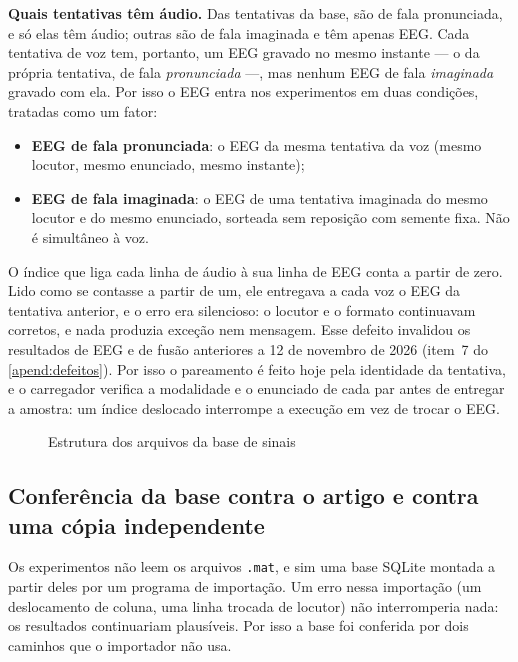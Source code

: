 		\par \textbf{Quais tentativas têm áudio.} Das tentativas da base,  são de fala pronunciada, e só elas têm áudio; outras  são de fala imaginada e têm apenas \ac{EEG}. Cada tentativa de voz tem, portanto, um \ac{EEG} gravado no mesmo instante --- o da própria tentativa, de fala \emph{pronunciada} ---, mas nenhum \ac{EEG} de fala \emph{imaginada} gravado com ela. Por isso o \ac{EEG} entra nos experimentos em duas condições, tratadas como um fator:
		\begin{itemize}
			\item \textbf{\ac{EEG} de fala pronunciada}: o \ac{EEG} da mesma tentativa da voz (mesmo locutor, mesmo enunciado, mesmo instante);
			\item \textbf{\ac{EEG} de fala imaginada}: o \ac{EEG} de uma tentativa imaginada do mesmo locutor e do mesmo enunciado, sorteada sem reposição com semente fixa. Não é simultâneo à voz.
		\end{itemize}

		\par O índice que liga cada linha de áudio à sua linha de \ac{EEG} conta a partir de zero. Lido como se contasse a partir de um, ele entregava a cada voz o \ac{EEG} da tentativa anterior, e o erro era silencioso: o locutor e o formato continuavam corretos, e nada produzia exceção nem mensagem. Esse defeito invalidou os resultados de \ac{EEG} e de fusão anteriores a 12 de novembro de 2026 (item~7 do \autoref{apend:defeitos}). Por isso o pareamento é feito hoje pela identidade da tentativa, e o carregador verifica a modalidade e o enunciado de cada par antes de entregar a amostra: um índice deslocado interrompe a execução em vez de trocar o \ac{EEG}.

		\begin{figure}[ht]
			\centering
			\caption[Organização da base de sinais]{Estrutura dos arquivos da base de sinais \cite{10.1117/12.2255697}}
			\scalebox{0.82}{
				
			}
			\label{fig:baseDeSinais}
		\end{figure}

		\subsection{Conferência da base contra o artigo e contra uma cópia independente}
			\label{sec:conferenciaCoretto}

			\par Os experimentos não leem os arquivos \texttt{.mat}, e sim uma base SQLite montada a partir deles por um programa de importação. Um erro nessa importação (um deslocamento de coluna, uma linha trocada de locutor) não interromperia nada: os resultados continuariam plausíveis. Por isso a base foi conferida por dois caminhos que o importador não usa.

